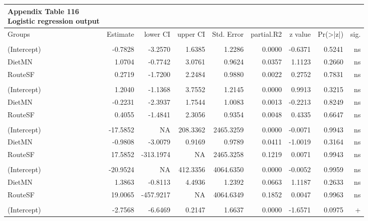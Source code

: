 \documentclass[
  12pt,
  letterpaper,
]{article}
\begin{document}
\begin{longtable}{l|rrrrrrrr}
\caption*{
{\large \textbf{Appendix Table 116}} \\ 
{\small \textbf{Logistic regression output}}
} \\ 
\toprule
\multicolumn{1}{l}{Groups} & Estimate & lower CI & upper CI & Std. Error & partial.R2 & z value & Pr(>|z|) & sig. \\ 
\midrule\addlinespace[2.5pt]
\multicolumn{9}{l}{Brain} \\ 
\midrule\addlinespace[2.5pt]
(Intercept) & -0.7828 & -3.2570 & 1.6385 & 1.2286 & 0.0000 & -0.6371 & 0.5241 & ns \\ 
DietMN & 1.0704 & -0.7742 & 3.0761 & 0.9624 & 0.0357 & 1.1123 & 0.2660 & ns \\ 
RouteSF & 0.2719 & -1.7200 & 2.2484 & 0.9880 & 0.0022 & 0.2752 & 0.7831 & ns \\ 
\midrule\addlinespace[2.5pt]
\multicolumn{9}{l}{Ear} \\ 
\midrule\addlinespace[2.5pt]
(Intercept) & 1.2040 & -1.1368 & 3.7552 & 1.2145 & 0.0000 & 0.9913 & 0.3215 & ns \\ 
DietMN & -0.2231 & -2.3937 & 1.7544 & 1.0083 & 0.0013 & -0.2213 & 0.8249 & ns \\ 
RouteSF & 0.4055 & -1.4841 & 2.3056 & 0.9354 & 0.0048 & 0.4335 & 0.6647 & ns \\ 
\midrule\addlinespace[2.5pt]
\multicolumn{9}{l}{Eye} \\ 
\midrule\addlinespace[2.5pt]
(Intercept) & -17.5852 & NA & 208.3362 & 2465.3259 & 0.0000 & -0.0071 & 0.9943 & ns \\ 
DietMN & -0.9808 & -3.0079 & 0.9169 & 0.9789 & 0.0411 & -1.0019 & 0.3164 & ns \\ 
RouteSF & 17.5852 & -313.1974 & NA & 2465.3258 & 0.1219 & 0.0071 & 0.9943 & ns \\ 
\midrule\addlinespace[2.5pt]
\multicolumn{9}{l}{Liver} \\ 
\midrule\addlinespace[2.5pt]
(Intercept) & -20.9524 & NA & 412.3356 & 4064.6350 & 0.0000 & -0.0052 & 0.9959 & ns \\ 
DietMN & 1.3863 & -0.8113 & 4.4936 & 1.2392 & 0.0663 & 1.1187 & 0.2633 & ns \\ 
RouteSF & 19.0065 & -457.9217 & NA & 4064.6349 & 0.1852 & 0.0047 & 0.9963 & ns \\ 
\midrule\addlinespace[2.5pt]
\multicolumn{9}{l}{Paw} \\ 
\midrule\addlinespace[2.5pt]
(Intercept) & -2.7568 & -6.6469 & 0.2147 & 1.6637 & 0.0000 & -1.6571 & 0.0975 & + \\ 

\end{longtable}
\end{document}
